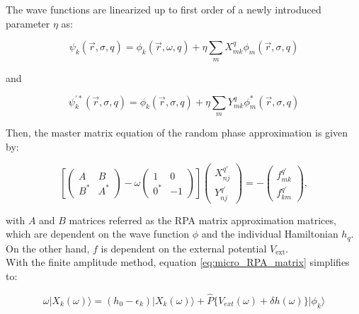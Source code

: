 \documentclass[openany]{book}
\begin{document}
The wave functions are linearized up to first order of a newly introduced parameter $\eta$ as: 

\begin{equation}\label{eq:micro_RPA_linearization_X}
	\psi_k(\vec r, \sigma, q) = \phi_k(\vec r, \omega, q) +  \eta \sum_{m}X^{q}_{mk} \phi_m(\vec r, \sigma, q)
\end{equation} 

and 

\begin{equation}\label{eq:micro_RPA_linearization_Y}
	\psi^{'*}_k(\vec r, \sigma, q) = \phi_k(\vec r, \sigma, q) +  \eta \sum_{m}Y^{q}_{mk} \phi^{*}_m(\vec r, \sigma, q)
\end{equation} 

Then, the master matrix equation of the random phase approximation is given by: 

\begin{equation}\label{eq:micro_RPA_matrix}
	\left[ \left(\begin{matrix}
		A & B \\
		B^{*} & A^{*}
	\end{matrix}\right) - \omega \left(\begin{matrix}
	1 & 0 \\
	0^{*} & -1
\end{matrix}\right)  \right] \left( \begin{matrix}
	X^{q'}_{nj} \\
	Y^{q'}_{nj}
\end{matrix}\right) = - \left( \begin{matrix}
f^{q'}_{mk} \\
f^{q'}_{km}
\end{matrix}\right),
\end{equation}

with $A$ and $B$ matrices referred as the RPA matrix approximation matrices, which are dependent on the wave function $\phi$ and the individual Hamiltonian $h_q$. On the other hand,  $f$ is dependent on the external potential $V_{\mathrm{ext}}$. \\ 

With the finite amplitude method, equation \ref{eq:micro_RPA_matrix} simplifies to: 

\begin{equation}\label{eq:micro_FAM_X}
	\omega | X_k(\omega) \rangle = (h_0 - \epsilon_k) | X_k(\omega) \rangle + \hat {P} \{V_{ext}(\omega) + \delta h (\omega)\} |\phi_k \rangle 
\end{equation}
\end{document}
